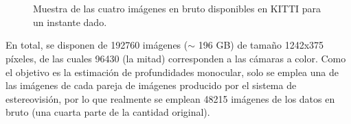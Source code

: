 \begin{figure}[H]
\centering
\hfil
	\\[-2ex]

\hfil
	\\[-2ex]
	
\caption{Muestra de las cuatro imágenes en bruto disponibles en KITTI para un instante dado.}
\label{fig:kitti-raw}
\end{figure}

En total, se disponen de 192760 imágenes ($\sim$ 196 GB) de tamaño 1242x375 píxeles, de las cuales 96430 (la mitad) corresponden a las cámaras a color. Como el objetivo es la estimación de profundidades monocular, solo se emplea una de las imágenes de cada pareja de imágenes producido por el sistema de estereovisión, por lo que realmente se emplean 48215 imágenes de los datos en bruto (una cuarta parte de la cantidad original).

